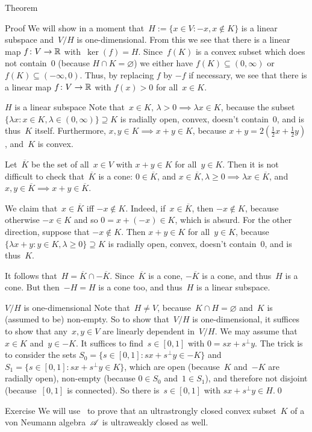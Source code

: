 \documentclass[a]{subfiles}
\begin{document}
\begin{parsec}
\begin{point}{Theorem}
\begin{point}{Proof}
We will show in a moment that~$H:=\{x\in V\colon -x,x\notin K\}$
is a linear subspace and~$V/H$ is one-dimensional.
From this we see that there is a linear map $f\colon V\to\mathbb{R}$
with~$\ker(f)=H$.
Since~$f(K)$ is a convex subset which does not contain~$0$
(because $H\cap K=\varnothing$)
we either have $f(K)\subseteq (0,\infty)$
or $f(K)\subseteq(-\infty,0)$.
Thus, by replacing $f$ by $-f$ if necessary,
we see that there is a linear map $f\colon V\to \mathbb{R}$
with $f(x)>0$ for all~$x\in K$.
\begin{point}{$H$ is a linear subspace}%
Note that~$x\in K,\,\lambda>0\implies \lambda x\in K$,
because the subset 
$\{\lambda x\colon x\in K,\lambda\in(0,\infty)\}\supseteq K$
is radially open, convex, doesn't contain~$0$,
and is thus~$K$ itself.
Furthermore,
$x,y\in K\implies x+y\in K$, because
$x+y=2(\frac{1}{2}x + \frac{1}{2}y)$, and~$K$ is convex.

Let~$\overline{K}$ be the set of all~$x\in V$
with $x+y\in K$ for all~$y\in K$.
Then it is not difficult to check that~$\overline{K}$ is a cone:
 $0\in\overline{K}$,
and
$x\in \overline{K},\lambda\geq 0\implies \lambda x\in \overline{K}$, and
$x,y\in\overline{K}\implies x+y\in \overline{K}$.

We claim that~$x\in \overline{K}$ iff $-x\notin K$.
Indeed, if~$x\in\overline{K}$, then $-x\notin K$, because otherwise
$-x\in K$ and so
$0=x+(-x)\in K$, which is absurd.
For the other direction, suppose that $-x\notin K$.
Then $x+y\in K$ for all~$y\in K$,
because
$\{\lambda x+y\colon y\in K,\lambda\geq0\}\supseteq K$
is radially open, convex, doesn't contain~$0$,
and is thus~$K$.

It follows that~$H=\overline{K}\cap -\overline{K}$.
Since~$\overline{K}$ is a cone, $-\overline{K}$ is a cone,
and thus~$H$ is a cone.  But then~$-H=H$ is a cone too,
and thus~$H$ is a linear subspace.
\end{point}
\begin{point}{$V/H$ is one-dimensional}%
Note that~$H\neq V$, because~$K\cap H=\varnothing$
and~$K$ is (assumed to be) non-empty.
So to show that~$V/H$ is one-dimensional,
it suffices to show that
any~$x,y\in V$ 
 are linearly dependent in~$V/H$.
We may assume that~$x\in K$ and~$y\in -K$.
It suffices to find~$s\in [0,1]$ with $0=sx+s^\perp y$.
The trick is to consider the sets
 $S_0 = \{s\in [0,1]\colon sx+s^\perp y \in -K\}$
and~$S_1 = \{s\in [0,1]\colon sx+s^\perp y \in K\}$,
which are open (because~$K$ and~$-K$ are radially open),
non-empty (because $0\in S_0$ and~$1\in S_1$),
and therefore not disjoint
(because~$[0,1]$ is connected).
So there is~$s\in [0,1]$ with $sx+s^\perp y \in H$.\qed
\end{point}
\end{point}
\end{point}
\begin{point}[ultraclosed]{Exercise}%
We will use~
to prove that 
an ultrastrongly closed convex subset~$K$ of a 
von Neumann algebra~$\mathscr{A}$
is ultraweakly closed as well.


\end{point}
\end{parsec}
\end{document}
